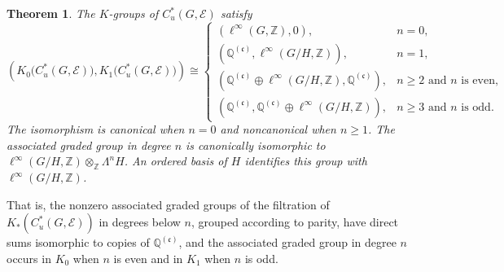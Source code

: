 \documentclass[pdflatex,sn-mathphys-num]{sn-jnl}%
\theoremstyle{plain}
\newtheorem*{theorem*}{Theorem}
\theoremstyle{remark}
\theoremstyle{definition}
\numberwithin{equation}{section}
\begin{document}
\begin{theorem*}
The \( K \)-groups of \( C_u^*(G,\mathcal E) \) satisfy
\[
\left(
K_0\bigl(C_u^*(G,\mathcal E)\bigr),
K_1\bigl(C_u^*(G,\mathcal E)\bigr)
\right)
\cong
\begin{cases}
\left(
\ell^\infty(G,\mathbb Z),
0
\right),
& n=0,\\[1ex]
\left(
\mathbb Q^{(\mathfrak c)},
\ell^\infty(G/H,\mathbb Z)
\right),
& n=1,\\[1ex]
\left(
\mathbb Q^{(\mathfrak c)}
\oplus
\ell^\infty(G/H,\mathbb Z),
\mathbb Q^{(\mathfrak c)}
\right),
& n\geq2 \text{ and } n \text{ is even},\\[1ex]
\left(
\mathbb Q^{(\mathfrak c)},
\mathbb Q^{(\mathfrak c)}
\oplus
\ell^\infty(G/H,\mathbb Z)
\right),
& n\geq3 \text{ and } n \text{ is odd}.
\end{cases}
\]
The isomorphism is canonical when \( n=0 \) and noncanonical when \( n\geq1 \). The associated graded group in degree \( n \) is canonically isomorphic to \( \ell^\infty(G/H,\mathbb Z)\otimes_{\mathbb Z}\Lambda^nH \). An ordered basis of \( H \) identifies this group with \( \ell^\infty(G/H,\mathbb Z) \).
\end{theorem*}


That is, the nonzero associated graded groups of the filtration of \( K_*(C_u^*(G,\mathcal E)) \) in degrees below \( n \), grouped according to parity, have direct sums isomorphic to copies of \( \mathbb Q^{(\mathfrak c)} \), and the associated graded group in degree \( n \) occurs in \( K_0 \) when \( n \) is even and in \( K_1 \) when \( n \) is odd.

%
\end{document}
